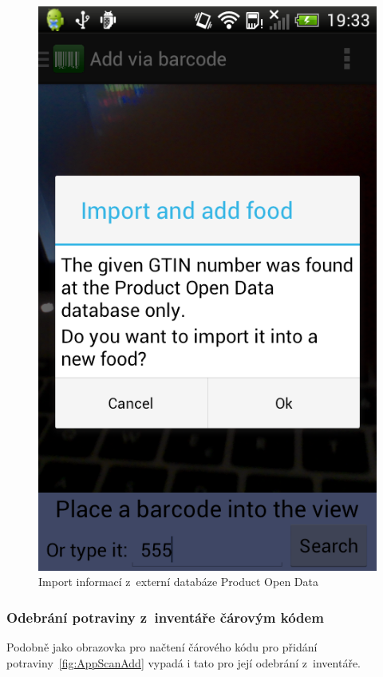 \documentclass[thesis=B,czech]{FITthesis}[2013/10/20]
\begin{document}
\begin{figure}[H]
\begin{minipage}{0.5\linewidth}
    \includegraphics[scale=0.3]{screenshots/app_scan_add_import.png}
    \caption{Import informací z~externí databáze Product Open Data}
    \label{fig:AppScanAddImport}
  \end{minipage} 
\end{figure}

\clearpage

\subsubsection{Odebrání potraviny z~inventáře čárovým kódem}

Podobně jako obrazovka pro načtení čárového kódu pro přidání potraviny~\ref{fig:AppScanAdd} vypadá i tato pro její odebrání z~inventáře.
\end{document}
